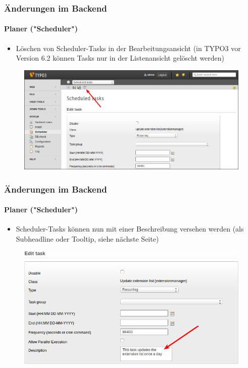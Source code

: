 
\begin{frame}[fragile]
	\frametitle{Änderungen im Backend}
	\framesubtitle{Planer ("Scheduler")}

	\begin{itemize}
		\item Löschen von Scheduler-Tasks in der Bearbeitungsansicht\newline
			\small(in TYPO3 vor Version 6.2 können Tasks nur in der Listenansicht gelöscht werden)\normalsize
	\end{itemize}

	\begin{figure}
		\includegraphics[width=0.95\linewidth]{Images/BackendChanges/DeleteSchedulerTaskInEditView.png}
	\end{figure}

\end{frame}


\begin{frame}[fragile]
	\frametitle{Änderungen im Backend}
	\framesubtitle{Planer ("Scheduler")}

	\begin{itemize}
		\item Scheduler-Tasks können nun mit einer Beschreibung versehen werden\newline
			\small(als Subheadline oder Tooltip, siehe nächste Seite)\normalsize
	\end{itemize}

	\begin{figure}
		\includegraphics[width=0.7\linewidth]{Images/BackendChanges/SchedulerTaskDescription.png}
	\end{figure}

\end{frame}

